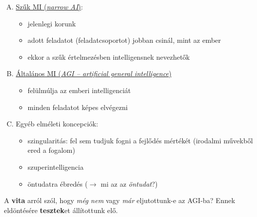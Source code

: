 \documentclass[a4paper, 11pt]{article}
\begin{document}
\begin{enumerate}[A)]
	\item \underline{Szűk MI (\textit{narrow AI})}:
	\begin{itemize}
		\item jelenlegi korunk
		\item adott feladatot (feladatcsoportot) jobban csinál, mint az ember
		\item ekkor a szűk értelmezésben intelligensnek nevezhetők
	\end{itemize}
	\item \underline{Általános MI (\textit{AGI -- artificial general intelligence})}
	\begin{itemize}
		\item felülmúlja az emberi intelligenciát
		\item minden feladatot képes elvégezni
	\end{itemize}
	\item Egyéb elméleti koncepciók: 
	\begin{itemize}
		\item szingularitás: fel sem tudjuk fogni a fejlődés mértékét (irodalmi művekből ered a fogalom)
		\item szuperintelligencia
		\item öntudatra ébredés ($\to$ mi az az \textit{öntudat}?)
	\end{itemize}
\end{enumerate}

A \textbf{vita} arról szól, hogy \textit{még nem} vagy \textit{már} eljutottunk-e az AGI-ba? Ennek eldöntésére \textbf{tesztek}et állítottunk elő.%
\end{document}
